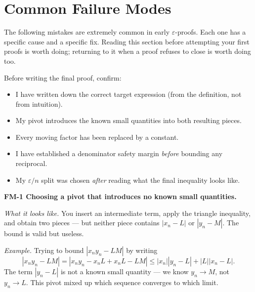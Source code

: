 \clearpage


\section{Common Failure Modes}
\label{sec:failure-modes}

The following mistakes are extremely common in early $\varepsilon$-proofs.
Each one has a specific cause and a specific fix.
Reading this section before attempting your first proofs is worth doing;
returning to it when a proof refuses to close is worth doing too.

\begin{tcolorbox}[colback=gray!6, colframe=gray!40, arc=2pt,
  left=8pt, right=8pt, top=6pt, bottom=6pt,
  title={\small\textbf{Pre-Proof Checklist}},
  fonttitle=\small\bfseries]
Before writing the final proof, confirm:
\begin{itemize}
  \item[$\square$] I have written down the correct target expression
                   (from the definition, not from intuition).
  \item[$\square$] My pivot introduces the known small quantities
                   into both resulting pieces.
  \item[$\square$] Every moving factor has been replaced by a constant.
  \item[$\square$] I have established a denominator safety margin
                   \emph{before} bounding any reciprocal.
  \item[$\square$] My $\varepsilon/n$ split was chosen \emph{after}
                   reading what the final inequality looks like.
\end{itemize}
\end{tcolorbox}

\medskip

\noindent\textbf{FM-1 \quad Choosing a pivot that introduces no known small quantities.}

\textit{What it looks like.}
You insert an intermediate term, apply the triangle inequality,
and obtain two pieces --- but neither piece contains $|x_n - L|$
or $|y_n - M|$.
The bound is valid but useless.

\textit{Example.}
Trying to bound $|x_n y_n - LM|$ by writing
\[
  |x_n y_n - LM| = |x_n y_n - x_n L + x_n L - LM|
  \le |x_n||y_n - L| + |L||x_n - L|.
\]
The term $|y_n - L|$ is not a known small quantity --- we know
$y_n \to M$, not $y_n \to L$.
This pivot mixed up which sequence converges to which limit.

